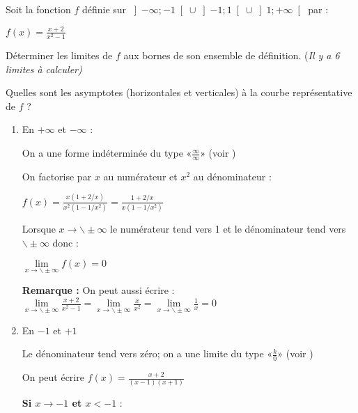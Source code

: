 
%
Soit la fonction $f$ définie sur $\left]-\infty  ; -1\right[ \cup  \left]-1 ; 1\right[ \cup  \left]1 ; +\infty \right[ $ par :
\par
$f\left(x\right)=\frac{x+2}{x^{2}-1}$
\par
Déterminer les limites de $f$ aux bornes de son ensemble de définition. (\textit{Il y a 6 limites à calculer)}
\par
Quelles sont les asymptotes (horizontales et verticales) à la courbe représentative de $f$ ?
\begin{corrige}
     \begin{enumerate}
          \item
          En $+\infty $ et $-\infty $ :
          \par
          On a une forme indéterminée du type «$\frac{\infty}{\infty} $» (voir )
          \par
          On factorise par $x$ au numérateur et $x^{2}$ au dénominateur :
          \par
          $f\left(x\right)=\frac{x\left(1+2/x\right)}{x^{2}\left(1-1/x^{2}\right)}=\frac{1+2/x}{x\left(1-1/x^{2}\right)}  $
          \par
          Lorsque $x\rightarrow \backslash\pm \infty $ le numérateur tend vers 1 et le dénominateur tend vers $\backslash\pm \infty $ donc :
          \par
          $\lim\limits_{x\rightarrow \backslash\pm \infty }f\left(x\right)=0$
\par
          \textbf{Remarque :} On peut aussi écrire : $\lim\limits_{x\rightarrow \backslash\pm \infty }\frac{x+2}{x^{2}-1}=\lim\limits_{x\rightarrow \backslash\pm \infty }\frac{x}{x^{2}}=\lim\limits_{x\rightarrow \backslash\pm \infty }\frac{1}{x}=0$
          \item
          En $-1$ et $+1$
          \par
          Le dénominateur tend vers zéro; on a une limite du type «$\frac{k}{0}$» (voir )
          \par
          On peut écrire $f\left(x\right)=\frac{x+2}{\left(x-1\right)\left(x+1\right)}$
\par
          \textbf{Si $x\rightarrow -1$ et $x < -1$} :
          \par

\end{enumerate}
\end{corrige}
